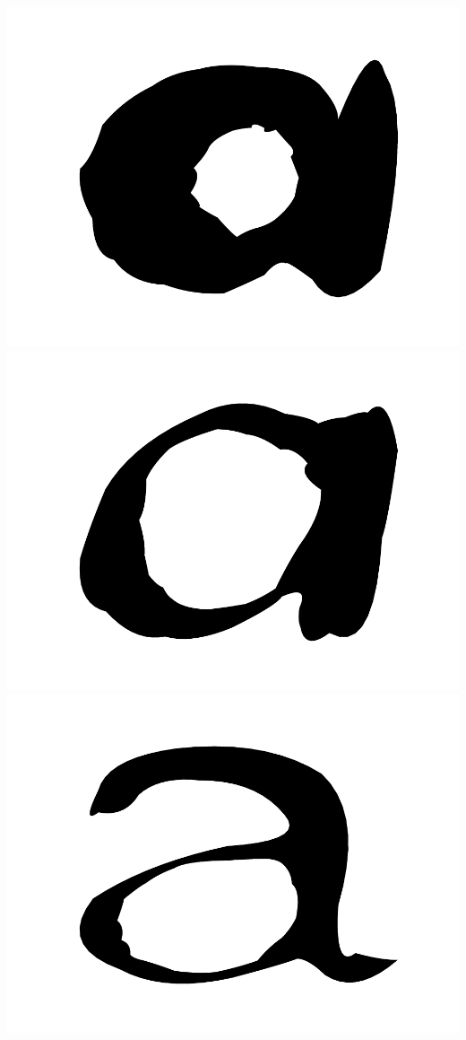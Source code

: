 \documentclass{article}
\begin{document}
{\begin{minipage}{21.5in}
\includegraphics[width=6.5in,trim=40 0 40 0,clip]{a3.pdf}\vspace{-1in}\\
\includegraphics[width=6.5in,trim=40 0 40 0,clip]{a4.pdf}
\includegraphics[width=6.5in,trim=40 0 40 0,clip]{a5.pdf}

\end{minipage}}
\end{document}

